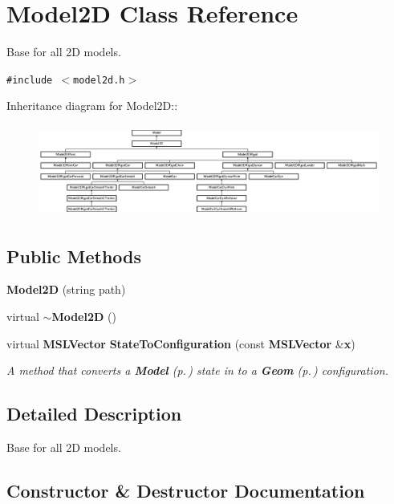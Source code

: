 \section{Model2D  Class Reference}
\label{classModel2D}
Base for all 2D models. 


{\tt \#include $<$model2d.h$>$}

Inheritance diagram for Model2D::\begin{figure}[H]
\begin{center}
\leavevmode
\includegraphics[height=3.03318cm]{classModel2D}
\end{center}
\end{figure}
\subsection*{Public Methods}
\begin{CompactItemize}
\item 
{\bf Model2D} (string path)
\item 
virtual {\bf $\sim$Model2D} ()
\item 
virtual {\bf MSLVector} {\bf State\-To\-Configuration} (const {\bf MSLVector} \&{\bf x})
\begin{CompactList}\small\item\em A method that converts a {\bf Model} {\rm (p.\,\pageref{classModel})} state in to a {\bf Geom} {\rm (p.\,\pageref{classGeom})} configuration.\item\end{CompactList}\end{CompactItemize}


\subsection{Detailed Description}
Base for all 2D models.



\subsection{Constructor \& Destructor Documentation}
